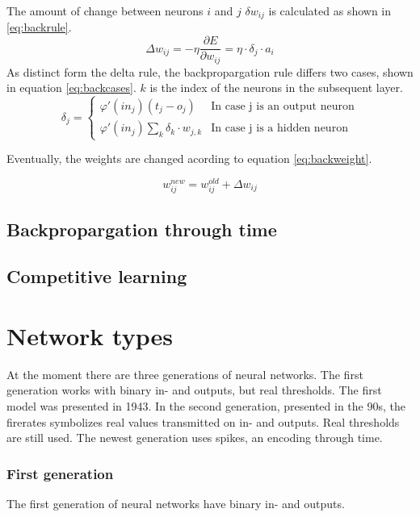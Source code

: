 \documentclass[10pt,a4paper,DIV=11]{scrreprt}
\begin{document}
The amount of change between neurons $i$ and $j$ $\delta w_{ij}$ is calculated as shown in \eqref{eq:backrule}.
\begin{equation}
\Delta w_{ij} = -\eta \frac{\partial E}{\partial w_{ij}} = \eta \cdot \delta_j \cdot a_i
\label{eq:backrule}
\end{equation}
As distinct form the delta rule, the backpropargation rule differs two cases, shown in equation \eqref{eq:backcases}. $k$ is the index of the neurons in the subsequent layer.
\begin{equation}
   \delta_j =
   \begin{cases}
     \varphi'(in_j)(t_j-o_j) & \text{In case j is an output neuron} \\
     \varphi'(in_j)\sum_{k} \delta_k \cdot w_{j,k} & \text{In case j is a hidden neuron}
   \end{cases}
\label{eq:backcases}
\end{equation}

Eventually, the weights are changed acording to equation \eqref{eq:backweight}.

\begin{equation}
   w_{ij}^{new} = w_{ij}^{old} + \Delta w_{ij}
\label{eq:backweight}
\end{equation}

\section{Backpropargation through time}
\section{Competitive learning}
\chapter{Network types}\label{chap:nets}
At the moment there are three generations of neural networks. 
The first generation works with binary in- and outputs, but real thresholds. The first model was presented in 1943.
In the second generation, presented in the 90s, the firerates symbolizes real values transmitted on in- and outputs. Real thresholds are still used.
The newest generation uses spikes, an encoding through time.

\subsection{First generation}
The first generation of neural networks have binary in- and outputs.
\end{document}
